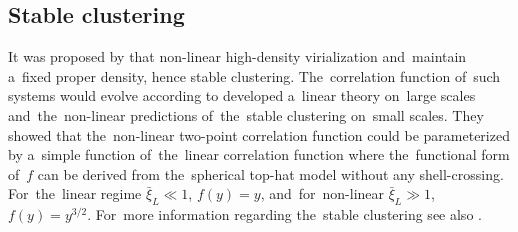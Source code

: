 \subsection{Stable clustering}
It was proposed by \textcite{1974ApJ...189L..51P} that \DIFdelbegin {}\DIFdelend \DIFaddbegin {}\DIFaddend non-linear \DIFdelbegin {}\DIFdelend \DIFaddbegin {}\DIFaddend high-density \DIFdelbegin {}\DIFdelend \DIFaddbegin {}\DIFaddend virialization and~\DIFdelbegin {}\DIFdelend \DIFaddbegin {}\DIFaddend maintain a~fixed proper density, hence stable clustering. The~correlation function \DIFdelbegin {}\DIFdelend of~such systems would \DIFdelbegin {}\DIFdelend evolve according to
\textcite{1991ApJ...374L...1H} developed a~\DIFdelbegin {}\DIFdelend \DIFaddbegin {}\DIFaddend linear theory on~large scales and~the~non-linear predictions of~the~stable clustering \DIFdelbegin {}\DIFdelend on~small scales. They showed that the~non-linear \DIFdelbegin {}\DIFdelend two-point correlation function could be parameterized by a~simple function of~the~linear correlation function
where the~functional form of~$f$ can be derived from the~spherical top-hat model without any shell-crossing. For~the~linear regime $\bar\xi_{L}\ll1$, $f(y)=y$, and~for~non-linear $\bar\xi_{L}\gg1$, $f(y)=y^{3/2}$. For~more information regarding the~stable clustering see  also \textcite{1996MNRAS.280L..19P,2003MNRAS.341.1311S}.

